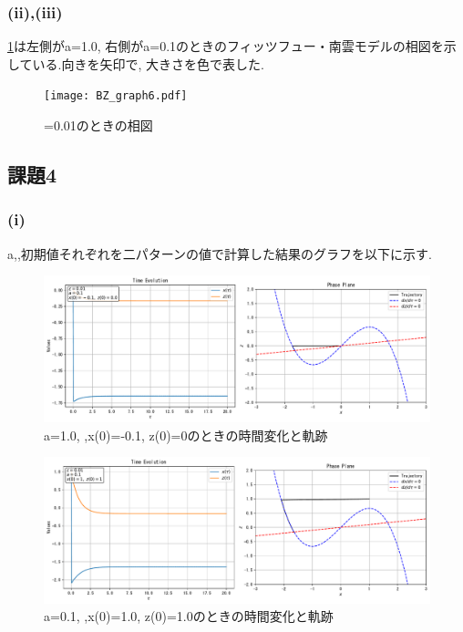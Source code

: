 \documentclass[11pt]{ltjsarticle}
\begin{document}
      \subsubsection*{(ii),(iii)}
      \cref{fig:phase1}は左側がa=1.0, 右側がa=0.1のときのフィッツフュー・南雲モデルの相図を示している.向きを矢印で, 大きさを色で表した.
        \begin{figure}[H]
          \raggedleft
          \texttt{[image: BZ\_graph6.pdf]}
          \caption{\epsilon=0.01のときの相図}
          \label{fig:phase1} 
        \end{figure}
    \subsection*{課題4}
      \subsubsection*{(i)}
        a,\epsilon,初期値それぞれを二パターンの値で計算した結果のグラフを以下に示す.
        \begin{figure}[H]
          \centering
          \includegraphics[width=0.98\columnwidth]{plot_1.pdf}
          \caption{a=1.0, ,x(0)=-0.1, z(0)=0のときの時間変化と軌跡}
        \end{figure}
        \begin{figure}[H]
          \centering
          \includegraphics[width=0.98\columnwidth]{plot_2.pdf}
          \caption{a=0.1, ,x(0)=1.0, z(0)=1.0のときの時間変化と軌跡}
        \end{figure}
\end{document}
